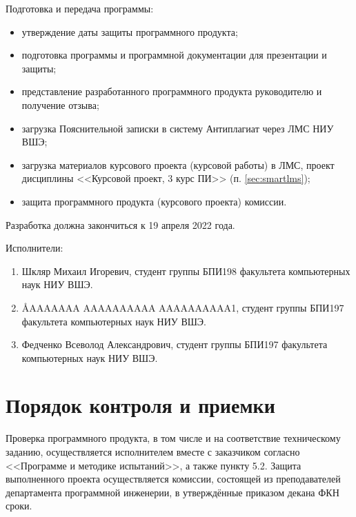 \documentclass[a4paper,12pt,reqno]{article}
\begin{document}
  Подготовка и передача программы:
  \begin{itemize}
    \item утверждение даты защиты программного продукта;
    \item подготовка программы и программной документации для презентации и защиты;
    \item представление разработанного программного продукта руководителю и получение отзыва;
    \item загрузка Пояснительной записки в систему Антиплагиат через ЛМС НИУ ВШЭ;
    \item загрузка материалов курсового проекта (курсовой работы) в ЛМС, проект дисциплины <<Курсовой проект, 3 курс ПИ>> (п. \ref{sec:smartlms});
    \item защита программного продукта (курсового проекта) комиссии.
  \end{itemize}
  Разработка должна закончиться к 19 апреля 2022 года.

  Исполнители:
  \begin{enumerate}
    \item Шкляр Михаил Игоревич, студент группы БПИ198 факультета компьютерных наук НИУ ВШЭ.
    \item \AA{AAAAAAA AAAAAAAAAA AAAAAAAAAA}{1}, студент группы БПИ197 факультета компьютерных наук НИУ ВШЭ.
    \item Федченко Всеволод Александрович, студент группы БПИ197 факультета компьютерных наук НИУ ВШЭ.
  \end{enumerate}

  \section{Порядок контроля и приемки}
  Проверка программного продукта, в том числе и на соответствие техническому заданию,
  осуществляется исполнителем вместе с заказчиком согласно <<Программе и методике испытаний>>, а также пункту 5.2.
  Защита выполненного проекта осуществляется комиссии, состоящей из преподавателей департамента программной инженерии,
  в утверждённые приказом декана ФКН сроки.

  \begin{CRTbibliography}
  \end{CRTbibliography}

  \CRTlistRegistration
\end{document}
